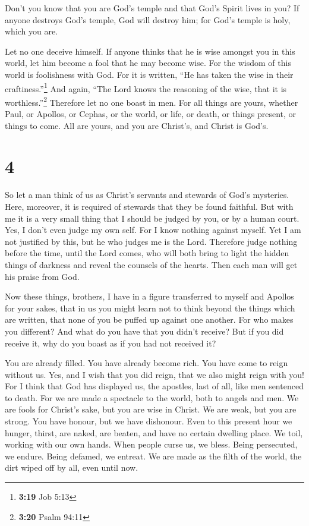  Don't you know that you are God's temple and that God's
Spirit lives in you?  If anyone destroys God's temple,
God will destroy him; for God's temple is holy, which you are.

 Let no one deceive himself. If anyone thinks that he is
wise amongst you in this world, let him become a fool that he may become
wise.  For the wisdom of this world is foolishness with
God. For it is written, ``He has taken the wise in their
craftiness.''\footnote{\textbf{3:19} Job 5:13}  And
again, ``The Lord knows the reasoning of the wise, that it is
worthless.''\footnote{\textbf{3:20} Psalm 94:11} 
Therefore let no one boast in men. For all things are yours,
 whether Paul, or Apollos, or Cephas, or the world, or
life, or death, or things present, or things to come. All are yours,
 and you are Christ's, and Christ is God's.

\hypertarget{section-3}{%
\section{4}\label{section-3}}

 So let a man think of us as Christ's servants and
stewards of God's mysteries.  Here, moreover, it is
required of stewards that they be found faithful.  But
with me it is a very small thing that I should be judged by you, or by a
human court. Yes, I don't even judge my own self.  For I
know nothing against myself. Yet I am not justified by this, but he who
judges me is the Lord.  Therefore judge nothing before the
time, until the Lord comes, who will both bring to light the hidden
things of darkness and reveal the counsels of the hearts. Then each man
will get his praise from God.

 Now these things, brothers, I have in a figure
transferred to myself and Apollos for your sakes, that in us you might
learn not to think beyond the things which are written, that none of you
be puffed up against one another.  For who makes you
different? And what do you have that you didn't receive? But if you did
receive it, why do you boast as if you had not received it?

 You are already filled. You have already become rich. You
have come to reign without us. Yes, and I wish that you did reign, that
we also might reign with you!  For I think that God has
displayed us, the apostles, last of all, like men sentenced to death.
For we are made a spectacle to the world, both to angels and men.
 We are fools for Christ's sake, but you are wise in
Christ. We are weak, but you are strong. You have honour, but we have
dishonour.  Even to this present hour we hunger, thirst,
are naked, are beaten, and have no certain dwelling place.
 We toil, working with our own hands. When people curse
us, we bless. Being persecuted, we endure.  Being
defamed, we entreat. We are made as the filth of the world, the dirt
wiped off by all, even until now.

